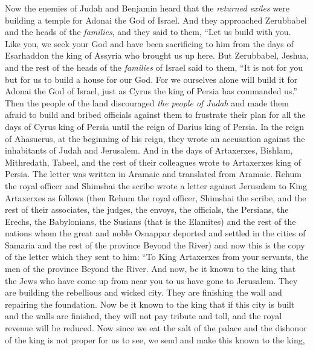 \begin{biblechapter} %
 Now the enemies of Judah and Benjamin heard that the \textit{returned exiles} were building a temple for Adonai the God of Israel.
\verse And they approached Zerubbabel and the heads of the \textit{families}, and they said to them, “Let us build with you. Like you, we seek your God and have been sacrificing to him from the days of Esarhaddon the king of Assyria who brought us up here.
\verse But Zerubbabel, Jeshua, and the rest of the heads of the \textit{families} of Israel said to them, “It is not for you but for us to build a house for our God. For we ourselves alone will build it for Adonai the God of Israel, just as Cyrus the king of Persia has commanded us.”
\verse Then the people of the land discouraged \textit{the people of Judah} and made them afraid to build
\verse and bribed officials against them to frustrate their plan for all the days of Cyrus king of Persia until the reign of Darius king of Persia.
 In the reign of Ahasuerus, at the beginning of his reign, they wrote an accusation against the inhabitants of Judah and Jerusalem.
\verse And in the days of Artaxerxes, Bishlam, Mithredath, Tabeel, and the rest of their colleagues wrote to Artaxerxes king of Persia. The letter was written in Aramaic and translated from Aramaic.
\verse Rehum the royal officer and Shimshai the scribe wrote a letter against Jerusalem to King Artaxerxes as follows
\verse (then Rehum the royal officer, Shimshai the scribe, and the rest of their associates, the judges, the envoys, the officials, the Persians, the Erechs, the Babylonians, the Susians (that is the Elamites)
\verse and the rest of the nations whom the great and noble Osnappar deported and settled in the cities of Samaria and the rest of the province Beyond the River) and now
\verse this is the copy of the letter which they sent to him:
\verse “To King Artaxerxes from your servants, the men of the province Beyond the River. And now,
\verse be it known to the king that the Jews who have come up from near you to us have gone to Jerusalem. They are building the rebellious and wicked city. They are finishing the wall and repairing the foundation.
\verse Now be it known to the king that if this city is built and the walls are finished, they will not pay tribute and toll, and the royal revenue will be reduced.
\verse Now since we eat the salt of the palace and the dishonor of the king is not proper for us to see, we send and make this known to the king,

\end{biblechapter}
